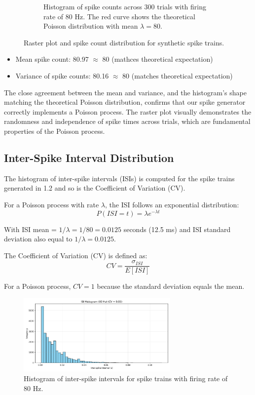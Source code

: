 \documentclass{article}
\begin{document}
\begin{figure}[H]
\begin{subfigure}{0.48\textwidth}
    \caption{Histogram of spike counts across 300 trials with firing rate of 80 Hz. The red curve shows the theoretical Poisson distribution with mean $\lambda = 80$.}
    \label{fig:spike_count_hist}
\end{subfigure}
\caption{Raster plot and spike count distribution for synthetic spike trains.}
\end{figure}

\begin{itemize}
\item Mean spike count: 80.97 $\approx$ 80 (mathces theoretical expectation)
\item Variance of spike counts: 80.16 $\approx$ 80 (matches theoretical expectation)
\end{itemize}


The close agreement between the mean and variance, and the histogram's shape matching the theoretical Poisson distribution, confirms that our spike generator correctly implements a Poisson process. 
The raster plot visually demonstrates the randomness and independence of spike times across trials, which are fundamental properties of the Poisson process.

\subsection{Inter-Spike Interval Distribution}

The histogram of inter-spike intervals (ISIs) is computed for the spike trains generated in 1.2 and so is the Coefficient of Variation (CV).

For a Poisson process with rate $\lambda$, the ISI follows an exponential distribution:
\begin{equation}
    P(ISI = t) = \lambda e^{-\lambda t}
\end{equation}

With ISI mean = $1/\lambda = 1/80 = 0.0125$ seconds (12.5 ms) and ISI standard deviation also equal to $1/\lambda = 0.0125$.

The Coefficient of Variation (CV) is defined as:
\begin{equation}
    CV = \frac{\sigma_{ISI}}{E[ISI]}
\end{equation}

For a Poisson process, $CV = 1$ because the standard deviation equals the mean.

\begin{figure}[H]
\centering
\includegraphics[width=0.7\textwidth]{Fig3.png}
\caption{Histogram of inter-spike intervals for spike trains with firing rate of 80 Hz.}
\label{fig:isi_hist}
\end{figure}
\end{document}
